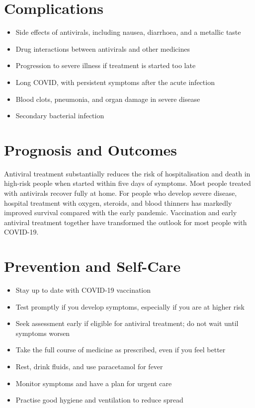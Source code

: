 \section*{Complications}
\begin{itemize}
    \item Side effects of antivirals, including nausea, diarrhoea, and a metallic taste
    \item Drug interactions between antivirals and other medicines
    \item Progression to severe illness if treatment is started too late
    \item Long COVID, with persistent symptoms after the acute infection
    \item Blood clots, pneumonia, and organ damage in severe disease
    \item Secondary bacterial infection
\end{itemize}

\section*{Prognosis and Outcomes}
Antiviral treatment substantially reduces the risk of hospitalisation and death in high-risk people when started within five days of symptoms. Most people treated with antivirals recover fully at home. For people who develop severe disease, hospital treatment with oxygen, steroids, and blood thinners has markedly improved survival compared with the early pandemic. Vaccination and early antiviral treatment together have transformed the outlook for most people with COVID-19.

\section*{Prevention and Self-Care}
\begin{itemize}
    \item Stay up to date with COVID-19 vaccination
    \item Test promptly if you develop symptoms, especially if you are at higher risk
    \item Seek assessment early if eligible for antiviral treatment; do not wait until symptoms worsen
    \item Take the full course of medicine as prescribed, even if you feel better
    \item Rest, drink fluids, and use paracetamol for fever
    \item Monitor symptoms and have a plan for urgent care
    \item Practise good hygiene and ventilation to reduce spread
\end{itemize}

